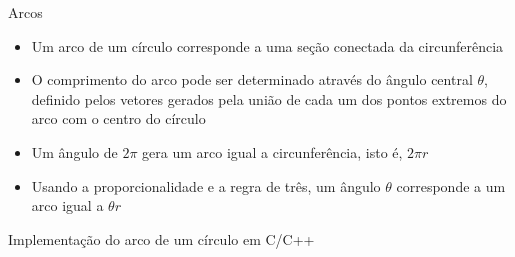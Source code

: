 \begin{frame}[fragile]{Arcos}

    \begin{itemize}
        \item Um arco de um círculo corresponde a uma seção conectada da circunferência 
        \pause

        \item O comprimento do arco pode ser determinado através do ângulo central $\theta$, 
            definido pelos vetores gerados pela união de cada um dos pontos extremos do arco com
            o centro do círculo
        \pause

        \item Um ângulo de $2\pi$ gera um arco igual a circunferência, isto é, $2\pi r$
        \pause

        \item Usando a proporcionalidade e a regra de três, um ângulo $\theta$  corresponde a um
            arco igual a $\theta r$
        \pause

        \begin{figure}
            \centering
        \end{figure}
    \end{itemize}

\end{frame}

\begin{frame}[fragile]{Implementação do arco de um círculo em C/C++}
\end{frame}

